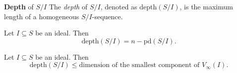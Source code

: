 \documentclass[co439]{subfiles}
\begin{document}
    \begin{definition}{\textbf{Depth} of $S /I$}
        The \emph{depth} of $S /I$, denoted as $\text{depth}\left( S /I \right)$, is the maximum length of a homogeneous $S /I$-sequence.
    \end{definition}

    \begin{theorem}{}
        Let $I\subseteq S$ be an ideal. Then
        \begin{equation*}
            \text{depth}\left( S /I \right) = n - \text{pd}\left( S /I \right).
        \end{equation*}
    \end{theorem}

    \rruleline

    \begin{cor}{}
        Let $I\subseteq S$ be an ideal. Then
        \begin{equation*}
            \text{depth}\left( S /I \right) \leq \text{dimension of the smallest component of $V_{\infty}\left( I \right)$}.
        \end{equation*}
    \end{cor}	

    \rruleline

    \clearpage
\end{document}
